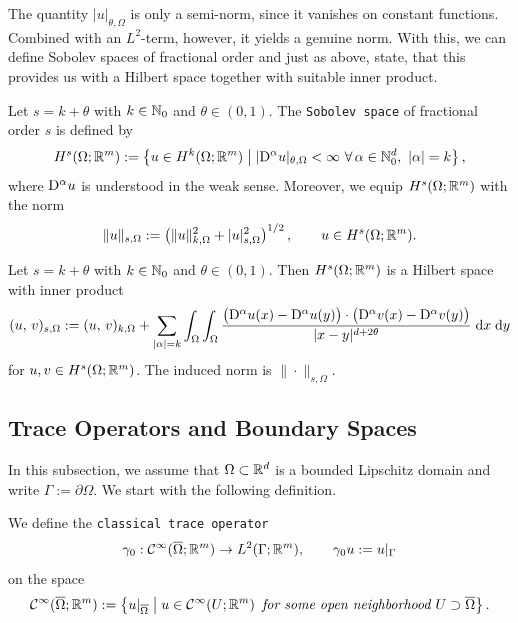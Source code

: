 The quantity $|u|_{\theta,\Omega}$ is only a semi-norm, since it vanishes on constant functions. Combined with an $L^2$-term, however, it yields a genuine norm. With this, we can define Sobolev spaces of fractional order and just as above, state, that this provides us with a Hilbert space together with suitable inner product.

\begin{definition}\label{def:fractionalsobolev}
	Let $s=k+\theta$ with $k\in{\mathbb N}_0$ and $\theta\in(0,1)$. The {\tt Sobolev space} of fractional order $s$ is defined by
	\begin{equation*}
		H^s(\Omega;{\mathbb R}^m)
		:=
		\left\{
		u\in H^k(\Omega;{\mathbb R}^m)\;\middle|\; |{\mathrm{D}}^\alpha u|_{\theta,\Omega}<\infty \ \forall\,\alpha\in{\mathbb N}_0^d,\ |\alpha|=k
		\right\},
	\end{equation*}
	where ${\mathrm{D}}^\alpha u$ is understood in the weak sense. Moreover, we equip $H^s(\Omega;{\mathbb R}^m)$ with the norm
	\begin{equation*}
		\|u\|_{s,\Omega}
		:=
		\left(
		\|u\|_{k,\Omega}^2 + |u|_{s,\Omega}^2
		\right)^{1/2},
		\qquad u\in H^s(\Omega;{\mathbb R}^m).
	\end{equation*}
\end{definition}


\begin{proposition}
	Let $s=k+\theta$ with $k\in{\mathbb N}_0$ and $\theta\in(0,1)$. Then $H^s(\Omega;{\mathbb R}^m)$ is a Hilbert space with inner product
	\begin{equation*}
		(u,\,v)_{s,\Omega}
		:=
		(u,\,v)_{k,\Omega}
		+
		\sum_{|\alpha|=k}
		\int_\Omega\int_\Omega
		\frac{\big({\mathrm{D}}^\alpha u(x)-{\mathrm{D}}^\alpha u(y)\big)\cdot\big({\mathrm{D}}^\alpha v(x)-{\mathrm{D}}^\alpha v(y)\big)}
		{|x-y|^{d+2\theta}}\;{{\mathrm{d}} x}\;{{\mathrm{d}} y}
	\end{equation*}
	for $u,v\in H^s(\Omega;{\mathbb R}^m)$. The induced norm is $\|\cdot\|_{s,\Omega}$.
	\eop
\end{proposition}

\subsection{Trace Operators and Boundary Spaces}

In this subsection, we assume that $\Omega\subset{\mathbb R}^d$ is a bounded Lipschitz domain and write $\Gamma:=\partial\Omega$. We start with the following definition.

\begin{definition}
	We define the {\tt classical trace operator}
	\begin{equation*}
		\gamma_0:{\mathcal C}^\infty(\overline{\Omega};{\mathbb R}^m)\to L^2(\Gamma;{\mathbb R}^m),
		\qquad
		\gamma_0 u:=u|_\Gamma
	\end{equation*}
	on the space
	\begin{equation*}
		{\mathcal C}^\infty(\overline{\Omega};{\mathbb R}^m)
		:=
		\left\{u|_{\overline{\Omega}}\;\middle|\;u\in {\mathcal C}^\infty(U;{\mathbb R}^m)\text{\em\enspace for some open neighborhood }U\supset\overline{\Omega}\right\}.
	\end{equation*}
\end{definition}

